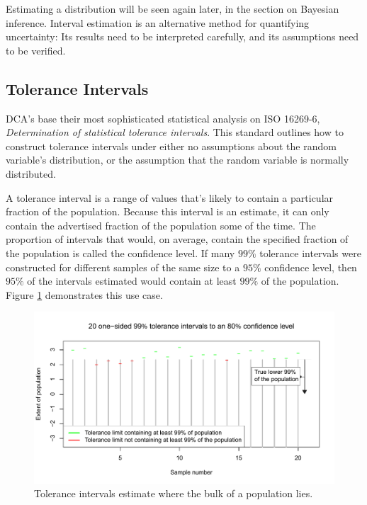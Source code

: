 \documentclass[11pt,a4paper,article]{memoir} %
\begin{document}
 Estimating a distribution will be seen again later, in the section on Bayesian inference. Interval estimation is an alternative method for quantifying uncertainty: Its results need to be interpreted carefully, and its assumptions need to be verified.

\par

\newpage
\subsection*{Tolerance Intervals}
DCA's base their most sophisticated statistical analysis on ISO 16269-6, \emph{Determination of statistical tolerance intervals}. This standard outlines how to construct tolerance intervals under either no assumptions about the random variable's distribution, or the assumption that the random variable is normally distributed.
\par
 A tolerance interval is a range of values that's likely to contain a particular fraction of the population. Because this interval is an estimate, it can only contain the advertised fraction of the population some of the time. The proportion of intervals that would, on average, contain the specified fraction of the population is called the confidence level. If many $99\%$ tolerance intervals were constructed for different samples of the same size to a $95\%$ confidence level, then $95\%$ of the intervals estimated would contain at least $99\%$ of the population. Figure \ref{fig:tolerance_intervals} demonstrates this use case.
\begin{figure}[h]
\includegraphics[width=\textwidth]{tolerance_intervals_2.pdf}
\caption{Tolerance intervals estimate where the bulk of a population lies.}
\label{fig:tolerance_intervals}
\end{figure}
\end{document}
